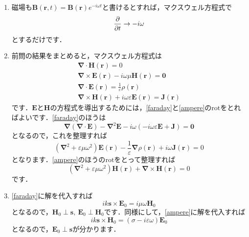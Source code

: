 \documentclass[a4paper,pdflatex,ja=standard]{bxjsarticle}
\begin{document}
\begin{enumerate}

  \item 

  磁場も$\bm{B}(\bm{r},t)=\bm{B}(\bm{r})e^{-i\omega t}$と書けるとすれば，マクスウェル方程式で
  \begin{equation}
    \pdv{}{t}
    \rightarrow
    -i\omega
  \end{equation}
  とするだけです．


  \item 

  前問の結果をまとめると，マクスウェル方程式は
  \begin{gather}
    \bm{\nabla}
    \cdot
    \bm{H}(\bm{r})
    =
    0
    \label{mag_zero}
    \\
    \bm{\nabla}
    \times
    \bm{E}(\bm{r})
    -
    i\omega\mu\bm{H}(\bm{r})
    =
    \bm{0}
    \label{faraday}
    \\
    \bm{\nabla}\cdot\bm{E}(\bm{r})
    =
    \frac{1}{\varepsilon}\rho(\bm{r})
    \label{gauss}
    \\
    \bm{\nabla}
    \times
    \bm{H}(\bm{r})
    +
    i\omega\varepsilon
    \bm{E}(\bm{r})
    =
    \bm{J}(\bm{r})
    \label{ampere}
  \end{gather}
  です．$\bm{E}$と$\bm{H}$の方程式を導出するためには，\eqref{faraday}と\eqref{ampere}の$\mathrm{rot}$をとればよいです．\eqref{faraday}のほうは
  \begin{equation}
    \bm{\nabla}(\bm{\nabla}\cdot\bm{E})
    -
    \bm{\nabla}^2\bm{E}
    -
    i\omega
    \left(  
      -
      i\omega\varepsilon\bm{E}
      +
      \bm{J}
    \right)
    =
    \bm{0}
  \end{equation}
  となるので，これを整理すれば
  \begin{equation}
    (\bm{\nabla}^2+\varepsilon\mu\omega^2)
    \bm{E}(\bm{r})
    -
    \frac{1}{\varepsilon}\bm{\nabla}\rho(\bm{r})
    +
    i\omega\bm{J}(\bm{r})
    =
    0
  \end{equation}
  となります．\eqref{ampere}のほうの$\mathrm{rot}$をとって整理すれば
  \begin{equation}
    (\bm{\nabla}^2+\varepsilon\mu\omega^2)
    \bm{H}(\bm{r})
    +
    \bm{\nabla}\times\bm{H}(\bm{r})
    =
    0
  \end{equation}
  です．


  \item 

  \eqref{faraday}に解を代入すれば
  \begin{equation}
    ik\bm{s}\times\bm{E}_0
    =
    i\mu\omega\bm{H}_0
    \label{faraday2}
  \end{equation}
  となるので，$\bm{H}_0\perp\bm{s},\ \bm{E}_0\perp\bm{H}_0$です．同様にして，\eqref{ampere}に解を代入すれば
  \begin{equation}
    ik\bm{s}\times\bm{H}_0
    =
    (\sigma-i\varepsilon\omega)\bm{E}_0
    \label{ampere2}
  \end{equation}
  となるので，$\bm{E}_0\perp\bm{s}$が分かります．



\end{enumerate}
\end{document}
